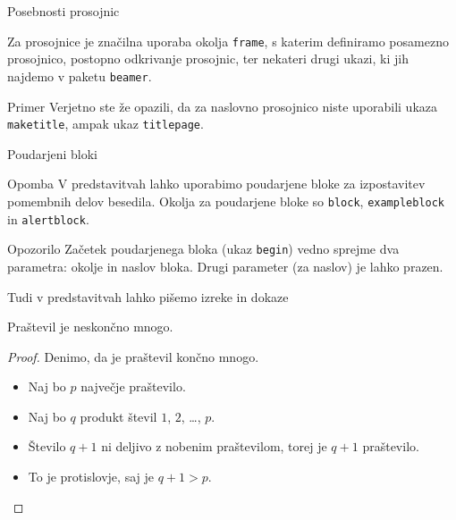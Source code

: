 \begin{frame}{Posebnosti prosojnic}

	Za prosojnice je značilna uporaba okolja \texttt{frame},
	s katerim definiramo posamezno prosojnico,\pause
	postopno odkrivanje prosojnic, \pause
	ter nekateri drugi ukazi, ki jih najdemo v paketu \texttt{beamer}.\pause
	\begin{exampleblock}{Primer}
		Verjetno ste že opazili, da za naslovno prosojnico niste uporabili
		ukaza \texttt{maketitle}, ampak ukaz \texttt{titlepage}.
	\end{exampleblock}
\end{frame}

\begin{frame}{Poudarjeni bloki}
\begin{block}{Opomba}
	V predstavitvah lahko uporabimo poudarjene bloke za izpostavitev pomembnih delov besedila.
		Okolja za poudarjene bloke so \texttt{block}, \texttt{exampleblock} in \texttt{alertblock}.
\end{block}
\begin{block}{Opozorilo}
		Začetek poudarjenega bloka (ukaz \texttt{begin}) vedno sprejme 
		dva parametra: okolje in naslov bloka.
		Drugi parameter (za naslov) je lahko prazen. 
\end{block}
\end{frame}

\begin{frame}{Tudi v predstavitvah lahko pišemo izreke in dokaze}

	\begin{izrek}
	   Praštevil je neskončno mnogo.
	\end{izrek}
	\begin{proof}
	   Denimo, da je praštevil končno mnogo.
	   \begin{itemize}[<+->]
		  \item Naj bo $p$ \alert<4->{največje} praštevilo.
		  \item Naj bo $q$ produkt števil $1$, $2$, \ldots, $p$.
		  \item Število $q+1$ ni deljivo z nobenim praštevilom, torej je $q+1$ praštevilo.
		  \item To je protislovje, saj je $q+1>p$. \qedhere
	   \end{itemize}
	\end{proof}
 \end{frame}
 
